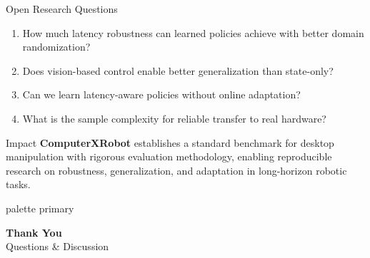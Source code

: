 \documentclass[10pt,aspectratio=16:9]{beamer}
\begin{document}
\begin{frame}{Open Research Questions}
  \begin{enumerate}
    \item How much latency robustness can learned policies achieve with better domain randomization?
    \item Does vision-based control enable better generalization than state-only?
    \item Can we learn latency-aware policies without online adaptation?
    \item What is the sample complexity for reliable transfer to real hardware?
  \end{enumerate}

  \vspace{1.5em}

  \begin{block}{Impact}
    \vspace{0.2em}
    \textbf{ComputerXRobot} establishes a standard benchmark for desktop manipulation with
    rigorous evaluation methodology, enabling reproducible research on robustness, generalization,
    and adaptation in long-horizon robotic tasks.
    \vspace{0.2em}
  \end{block}
\end{frame}

\begin{frame}[plain]
  \begin{beamercolorbox}[sep=1em,wd=\paperwidth,ht=\paperheight]{palette primary}
    \vfill
    \begin{center}
      {\Large \textbf{Thank You}} \\[1em]
      {\normalsize Questions \& Discussion}
    \end{center}
    \vfill
  \end{beamercolorbox}
\end{frame}
\end{document}
